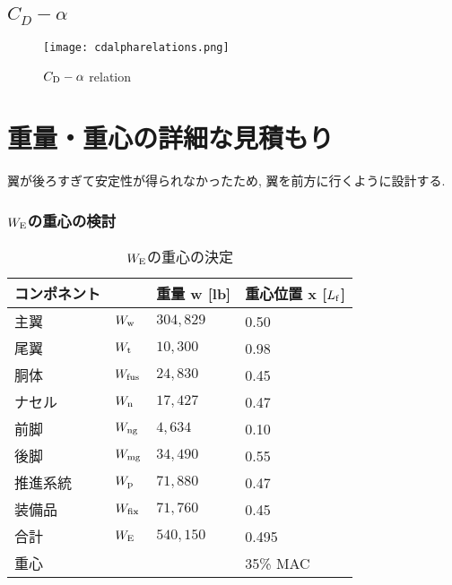 \documentclass[12pt]{jsarticle}
\begin{document}
\subsection{$C_{D}-\alpha$}
\begin{figure}[H]
\begin{center}
\texttt{[image: cdalpharelations.png]}
\caption{$C_{\rm D}-\alpha$ relation}
\end{center}
\end{figure}

\section{重量・重心の詳細な見積もり}
翼が後ろすぎて安定性が得られなかったため, 翼を前方に行くように設計する.
\subsubsection{$W_{\rm E}$の重心の検討}
\begin{table}[H]
	\caption{$W_{\rm E}$の重心の決定}
	\begin{center}
		\begin{tabular}{p{2cm} p{2cm} p{3cm} p{3cm}} \hline
			コンポネント  & & 重量 w [lb] & 重心位置 x [$L_{\rm f}$] \\ \hline \hline
			主翼 & $W_{\rm w}$ & $304,829$ & 0.50 \\
			尾翼 & $W_{\rm t}$ & $10,300$ & 0.98 \\
			胴体 & $W_{\rm fus}$ & $24,830$ & 0.45 \\
			ナセル & $W_{\rm n}$ & $17,427$ & 0.47 \\
			前脚 & $W_{\rm ng}$ & $4,634$ & 0.10 \\
			後脚 & $W_{\rm mg}$ & $34,490$ & 0.55 \\
			推進系統 & $W_{\rm p}$ & $71,880$ & 0.47 \\
			装備品 & $W_{\rm fix}$ & $71,760$ & 0.45 \\ \hline
			合計 & $W_{\rm E}$ & $540,150$ & 0.495 \\ \hline \hline
			重心 & & & 35\% MAC \\ \hline
		\end{tabular}
	\end{center}
\end{table}
\end{document}
